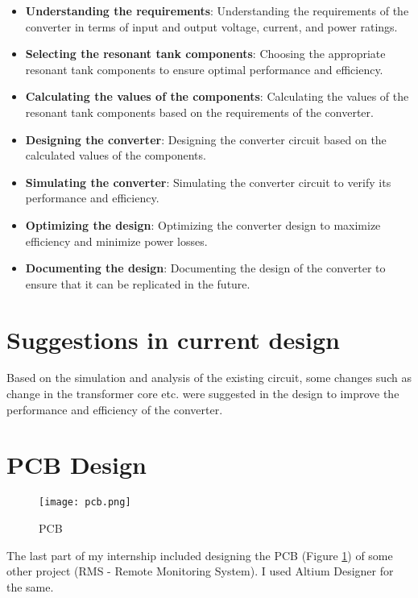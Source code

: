 \begin{itemize}
    \item \textbf{Understanding the requirements}: Understanding the requirements of the converter in terms of input and output voltage, current, and power ratings.
    \item \textbf{Selecting the resonant tank components}: Choosing the appropriate resonant tank components to ensure optimal performance and efficiency.
    \item \textbf{Calculating the values of the components}: Calculating the values of the resonant tank components based on the requirements of the converter.
    \item \textbf{Designing the converter}: Designing the converter circuit based on the calculated values of the components.
    \item \textbf{Simulating the converter}: Simulating the converter circuit to verify its performance and efficiency.
    \item \textbf{Optimizing the design}: Optimizing the converter design to maximize efficiency and minimize power losses.
    \item \textbf{Documenting the design}: Documenting the design of the converter to ensure that it can be replicated in the future.
\end{itemize}

\section{Suggestions in current design}
Based on the simulation and analysis of the existing circuit, some changes such as change in the transformer core etc. were suggested in the design to improve the performance and efficiency of the converter.

\section{PCB Design}
\begin{figure}[ht]
    \centering
    \texttt{[image: pcb.png]}
    \caption{PCB}
    \label{fig:pcb_out}
\end{figure}
The last part of my internship included designing the PCB (Figure \ref*{fig:pcb_out}) of some other project (RMS - Remote Monitoring System). I used Altium Designer for the same.
